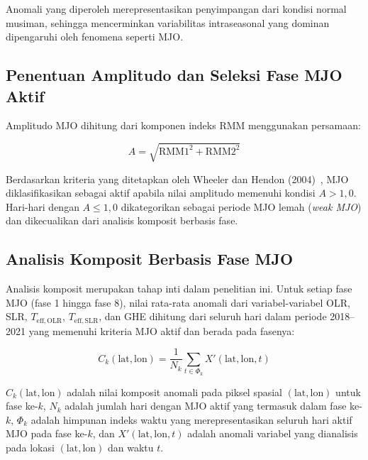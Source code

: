 \documentclass[12pt,a4paper]{report}
\begin{document}
Anomali yang diperoleh merepresentasikan penyimpangan dari kondisi normal
musiman, sehingga mencerminkan variabilitas intraseasonal yang dominan
dipengaruhi oleh fenomena seperti MJO.

\subsection{Penentuan Amplitudo dan Seleksi Fase MJO Aktif}

Amplitudo MJO dihitung dari komponen indeks RMM menggunakan persamaan:

\begin{equation}
  A = \sqrt{\mathrm{RMM1}^{2} + \mathrm{RMM2}^{2}}
  \label{eq:amplitude}
\end{equation}

Berdasarkan kriteria yang ditetapkan oleh Wheeler dan Hendon
(2004)~\cite{Wheeler2004}, MJO diklasifikasikan sebagai aktif
apabila nilai amplitudo memenuhi kondisi $A > 1{,}0$. Hari-hari dengan
$A \leq 1{,}0$ dikategorikan sebagai periode MJO lemah (\textit{weak MJO})
dan dikecualikan dari analisis komposit berbasis fase.


\subsection{Analisis Komposit Berbasis Fase MJO}

Analisis komposit merupakan tahap inti dalam penelitian ini. Untuk setiap fase
MJO (fase 1 hingga fase 8), nilai rata-rata anomali dari variabel-variabel OLR,
SLR, $T_{\mathrm{eff,OLR}}$, $T_{\mathrm{eff,SLR}}$, dan GHE dihitung dari
seluruh hari dalam periode 2018--2021 yang memenuhi kriteria MJO aktif dan
berada pada fasenya:

\begin{equation}
C_k(\mathrm{lat}, \mathrm{lon}) =
\frac{1}{N_k}
\sum_{t \in \Phi_k} X'(\mathrm{lat}, \mathrm{lon}, t)
\label{eq:composite}
\end{equation}

\noindent
$C_k(\mathrm{lat}, \mathrm{lon})$ adalah nilai komposit anomali pada
piksel spasial $(\mathrm{lat}, \mathrm{lon})$ untuk fase ke-$k$, $N_k$ adalah
jumlah hari dengan MJO aktif yang termasuk dalam fase ke-$k$, $\Phi_k$ adalah
himpunan indeks waktu yang merepresentasikan seluruh hari aktif MJO pada fase
ke-$k$, dan $X'(\mathrm{lat}, \mathrm{lon}, t)$ adalah anomali variabel yang
dianalisis pada lokasi $(\mathrm{lat}, \mathrm{lon})$ dan waktu $t$.
\end{document}
